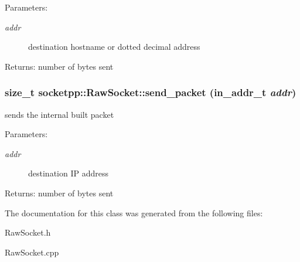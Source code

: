 \begin{Desc}
\item[Parameters:]
\begin{description}
\item[{\em addr}]destination hostname or dotted decimal address \end{description}
\end{Desc}
\begin{Desc}
\item[Returns:]number of bytes sent \end{Desc}
\hypertarget{classsocketpp_1_1RawSocket_5c812c1bf584f40c3fc6263a8014395b}{
\subsubsection[{send\_\-packet}]{\setlength{\rightskip}{0pt plus 5cm}size\_\-t socketpp::RawSocket::send\_\-packet (in\_\-addr\_\-t {\em addr})}}
\label{classsocketpp_1_1RawSocket_5c812c1bf584f40c3fc6263a8014395b}


sends the internal built packet 

\begin{Desc}
\item[Parameters:]
\begin{description}
\item[{\em addr}]destination IP address \end{description}
\end{Desc}
\begin{Desc}
\item[Returns:]number of bytes sent \end{Desc}


The documentation for this class was generated from the following files:\begin{CompactItemize}
\item 
RawSocket.h\item 
RawSocket.cpp\end{CompactItemize}
